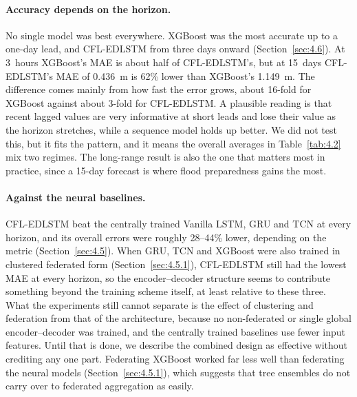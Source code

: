 \paragraph{Accuracy depends on the horizon.}
No single model was best everywhere. XGBoost was the most accurate up to a
one-day lead, and CFL-EDLSTM from three days onward (Section~\ref{sec:4.6}). At
3~hours XGBoost's MAE is about half of CFL-EDLSTM's, but at 15~days CFL-EDLSTM's
MAE of 0.436~m is 62\% lower than XGBoost's 1.149~m. The difference comes mainly
from how fast the error grows, about 16-fold for XGBoost against about 3-fold for
CFL-EDLSTM. A plausible reading is that recent lagged values are very informative
at short leads and lose their value as the horizon stretches, while a sequence
model holds up better. We did not test this, but it fits the pattern, and it
means the overall averages in Table~\ref{tab:4.2} mix two regimes. The long-range
result is also the one that matters most in practice, since a 15-day forecast is
where flood preparedness gains the most.

\paragraph{Against the neural baselines.}
CFL-EDLSTM beat the centrally trained Vanilla LSTM, GRU and TCN at every horizon,
and its overall errors were roughly 28--44\% lower, depending on the metric
(Section~\ref{sec:4.5}). When GRU, TCN and XGBoost were also trained in clustered
federated form (Section~\ref{sec:4.5.1}), CFL-EDLSTM still had the lowest MAE at
every horizon, so the encoder--decoder structure seems to contribute something
beyond the training scheme itself, at least relative to these three. What the
experiments still cannot separate is the effect of clustering and federation from
that of the architecture, because no non-federated or single global
encoder--decoder was trained, and the centrally trained baselines use fewer input
features. Until that is done, we describe the combined design as effective
without crediting any one part. Federating XGBoost worked far less well than
federating the neural models (Section~\ref{sec:4.5.1}), which suggests that tree
ensembles do not carry over to federated aggregation as easily.

